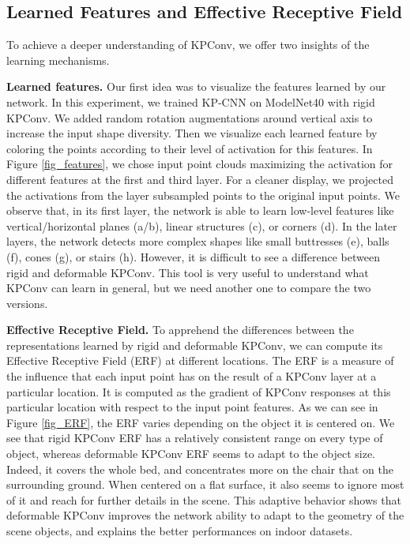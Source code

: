 \documentclass[10pt,twocolumn,letterpaper]{article}
\begin{document}
\subsection{Learned Features and Effective Receptive Field}

To achieve a deeper understanding of KPConv, we offer two insights of the learning mechanisms. 

\noindent
\textbf{Learned features.} Our first idea was to visualize the features learned by our network. In this experiment, we trained KP-CNN on ModelNet40 with rigid KPConv. We added random rotation augmentations around vertical axis to increase the input shape diversity. Then we visualize each learned feature by coloring the points according to their level of activation for this features. In Figure \ref{fig_features}, we chose input point clouds maximizing the activation for different features at the first and third layer. For a cleaner display, we projected the activations from the layer subsampled points to the original input points. We observe that, in its first layer, the network is able to learn low-level features like vertical/horizontal planes (a/b), linear structures (c), or corners (d). In the later layers, the network detects more complex shapes like small buttresses (e), balls (f), cones (g), or stairs (h). However, it is difficult to see a difference between rigid and deformable KPConv. This tool is very useful to understand what KPConv can learn in general, but we need another one to compare the two versions.

\noindent
\textbf{Effective Receptive Field.} To apprehend the differences between the representations learned by rigid and deformable KPConv, we can compute its Effective Receptive Field (ERF) \cite{luo2016understanding} at different locations. The ERF is a measure of the influence that each input point has on the result of a KPConv layer at a particular location. It is computed as the gradient of KPConv responses at this particular location with respect to the input point features. As we can see in Figure \ref{fig_ERF}, the ERF varies depending on the object it is centered on. We see that rigid KPConv ERF has a relatively consistent range on every type of object, whereas deformable KPConv ERF seems to adapt to the object size. Indeed, it covers the whole bed, and concentrates more on the chair that on the surrounding ground. When centered on a flat surface, it also seems to ignore most of it and reach for further details in the scene. This adaptive behavior shows that deformable KPConv improves the network ability to adapt to the geometry of the scene objects, and explains the better performances on indoor datasets.
\end{document}
